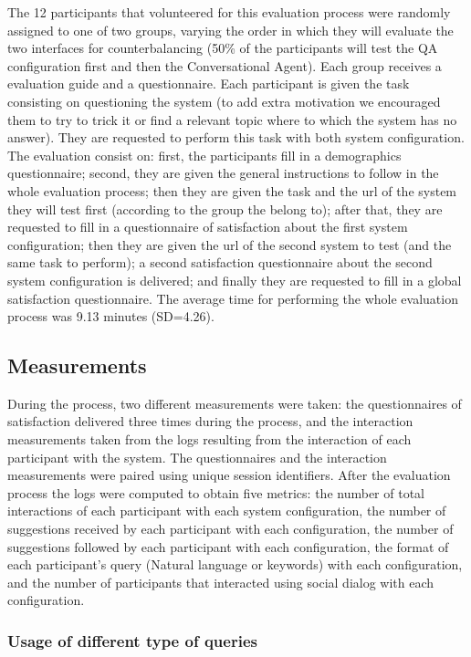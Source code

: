 The 12 participants that volunteered for this evaluation process were randomly assigned to one of two groups, varying the order in which they will evaluate the two interfaces for counterbalancing (50\% of the participants will test the QA configuration first and then the Conversational Agent). Each group receives a evaluation guide and a questionnaire. Each participant is given the task consisting on questioning the system (to add extra motivation we encouraged them to try to trick it or find a relevant topic where to which the system has no answer). They are requested to perform this task with both system configuration.
The evaluation consist on: first, the participants fill in a demographics questionnaire; second, they are given the general instructions to follow in the whole evaluation process; then they are given the task and the url of the system they will test first (according to the group the belong to); after that, they are requested to fill in a questionnaire of satisfaction about the first system configuration; then they are given the url of the second system to test (and the same task to perform); a second satisfaction questionnaire about the second system configuration is delivered; and finally they are requested to fill in a global satisfaction questionnaire. The average time for performing the whole evaluation process was 9.13 minutes (SD=4.26).

\subsection{Measurements}

During the process, two different measurements were taken: the questionnaires of satisfaction delivered three times during the process, and the interaction measurements taken from the logs resulting from the interaction of each participant with the system. The questionnaires and the interaction measurements were paired using unique session identifiers. After the evaluation process the logs were computed to obtain five metrics: the number of total interactions of each participant with each system configuration, the number of suggestions received by each participant with each configuration, the number of suggestions followed by each participant with each configuration, the format of each participant's query (Natural language or keywords) with each configuration, and the number of participants that interacted using social dialog with each configuration.

\subsubsection{Usage of different type of queries}

